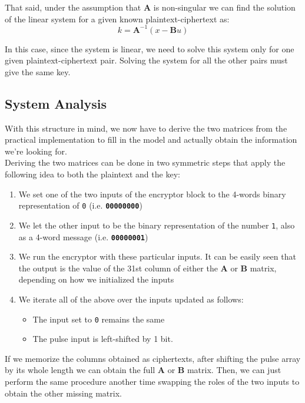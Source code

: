 \documentclass[a4paper,12pt,titlepage]{article}
\begin{document}
That said, under the assumption that $\mathbf{A}$ is non-singular we
can find the solution of the linear system for a given known
plaintext-ciphertext as:
\[k = \mathbf{A}^{-1}(x - \mathbf{B}u)\]

In this case, since the system is linear, we need to solve this system only for
one given plaintext-ciphertext pair. Solving the system for all the other pairs
must give the same key.

\subsection*{System Analysis}
With this structure in mind, we now have to derive the two matrices from the
practical implementation to fill in the model and actually obtain the
information we're looking for. \\
Deriving the two matrices can be done in two symmetric steps that apply the
following idea to both the plaintext and the key:

\begin{enumerate}
	\item We set one of the two inputs of the encryptor block to the 4-words binary
        representation of \texttt{0} (i.e. \textbf{\texttt{00000000}})
	\item We let the other input to be the binary representation of the number \texttt{1},
        also as a 4-word message (i.e. \textbf{\texttt{00000001}})
	\item We run the encryptor with these particular inputs. It can be easily seen
        that the output is the value of the 31st column of either the
        $\mathbf{A}$ or $\mathbf{B}$ matrix, depending on how we
        initialized the inputs
	\item We iterate all of the above over the inputs updated as follows:
    \begin{itemize}
      \item The input set to \texttt{0} remains the same
      \item  The pulse input is left-shifted by 1 bit.
    \end{itemize}
\end{enumerate}

If we memorize the columns obtained as ciphertexts, after shifting the pulse
array by its whole length we can obtain the full $\mathbf{A}$ or
$\mathbf{B}$ matrix. Then, we can just perform the same procedure
another time swapping the roles of the two inputs to obtain the other missing
matrix.
\end{document}

